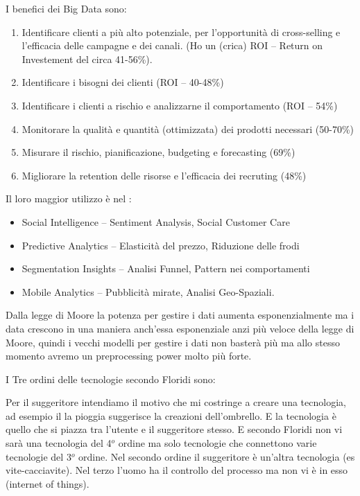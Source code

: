 \documentclass[a4page, 11pt]{article}
\begin{document}
I benefici dei Big Data sono:

\begin{enumerate}
	\def\labelenumi{\arabic{enumi}.}
	 
	\item
	Identificare clienti a più alto potenziale, per l'opportunità di
	cross-selling e l'efficacia delle campagne e dei canali. (Ho un
	(crica) ROI -- Return on Investement del circa 41-56\%).
	\item
	Identificare i bisogni dei clienti (ROI -- 40-48\%)
	\item
	Identificare i clienti a rischio e analizzarne il comportamento (ROI
	-- 54\%)
	\item
	Monitorare la qualità e quantità (ottimizzata) dei prodotti necessari
	(50-70\%)
	\item
	Misurare il rischio, pianificazione, budgeting e forecasting (69\%)
	\item
	Migliorare la retention delle risorse e l'efficacia dei recruting
	(48\%)
\end{enumerate}

Il loro maggior utilizzo è nel :

\begin{itemize}
	 
	\item
	Social Intelligence -- Sentiment Analysis, Social Customer Care
	\item
	Predictive Analytics -- Elasticità del prezzo, Riduzione delle frodi
	\item
	Segmentation Insights -- Analisi Funnel, Pattern nei comportamenti
	\item
	Mobile Analytics -- Pubblicità mirate, Analisi Geo-Spaziali.
\end{itemize}

Dalla legge di Moore la potenza per gestire i dati aumenta
esponenzialmente ma i data crescono in una maniera anch'essa
esponenziale anzi più veloce della legge di Moore, quindi i vecchi
modelli per gestire i dati non basterà più ma allo stesso momento avremo
un preprocessing power molto più forte.

I Tre ordini delle tecnologie secondo Floridi sono:

Per il suggeritore intendiamo il motivo che mi costringe a creare una
tecnologia, ad esempio il la pioggia suggerisce la creazioni
dell'ombrello. E la tecnologia è quello che si piazza tra l'utente e il
suggeritore stesso. E secondo Floridi non vi sarà una tecnologia del 4$^o$
ordine ma solo tecnologie che connettono varie tecnologie del 3$^o$ ordine.
Nel secondo ordine il suggeritore è un'altra tecnologia (es vite-cacciavite).
Nel terzo l'uomo ha il controllo del processo ma non vi è in esso (internet
of things).
\end{document}
